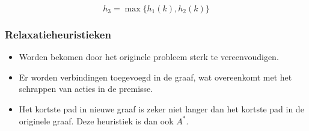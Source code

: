 \begin{itemize}
\begin{itemize}
\begin{itemize}
			$$h_3 = \max\{h_1(k), h_2(k)\}$$
		\end{itemize}
		
	\end{itemize}
\end{itemize}

\subsubsection{Relaxatieheuristieken}
\begin{itemize}
	\item Worden bekomen door het originele probleem sterk te vereenvoudigen.
	\item Er worden verbindingen toegevoegd in de graaf, wat overeenkomt met het schrappen van acties in de premisse.
	\item Het kortste pad in nieuwe graaf is zeker niet langer dan het kortste pad in de originele graaf. Deze heuristiek is dan ook $A^*$.
\end{itemize}

